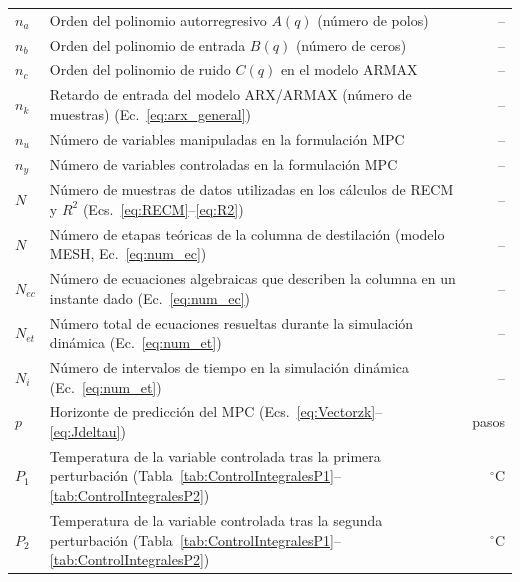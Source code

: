 \begin{longtable}{@{} l p{} r @{}}
$n_a$
  & Orden del polinomio autorregresivo $A(q)$ (número de polos)
  & -- \\

$n_b$
  & Orden del polinomio de entrada $B(q)$ (número de ceros)
  & -- \\

$n_c$
  & Orden del polinomio de ruido $C(q)$ en el modelo ARMAX
  & -- \\

$n_k$
  & Retardo de entrada del modelo ARX/ARMAX (número de muestras) (Ec.~\ref{eq:arx_general})
  & -- \\

$n_u$
  & Número de variables manipuladas en la formulación MPC
  & -- \\

$n_y$
  & Número de variables controladas en la formulación MPC
  & -- \\

$N$
  & Número de muestras de datos utilizadas en los cálculos de RECM y $R^2$ (Ecs.~\ref{eq:RECM}--\ref{eq:R2})
  & -- \\

$N$
  & Número de etapas teóricas de la columna de destilación (modelo MESH, Ec.~\ref{eq:num_ec})
  & -- \\

$N_{ec}$
  & Número de ecuaciones algebraicas que describen la columna en un instante dado (Ec.~\ref{eq:num_ec})
  & -- \\

$N_{et}$
  & Número total de ecuaciones resueltas durante la simulación dinámica (Ec.~\ref{eq:num_et})
  & -- \\

$N_i$
  & Número de intervalos de tiempo en la simulación dinámica (Ec.~\ref{eq:num_et})
  & -- \\

$p$
  & Horizonte de predicción del MPC (Ecs.~\ref{eq:Vectorzk}--\ref{eq:Jdeltau})
  & pasos \\

$P_1$
  & Temperatura de la variable controlada tras la primera perturbación (Tabla~\ref{tab:ControlIntegralesP1}--\ref{tab:ControlIntegralesP2})
  & $^{\circ}$C \\

$P_2$
  & Temperatura de la variable controlada tras la segunda perturbación (Tabla~\ref{tab:ControlIntegralesP1}--\ref{tab:ControlIntegralesP2})
  & $^{\circ}$C \\


\end{longtable}
